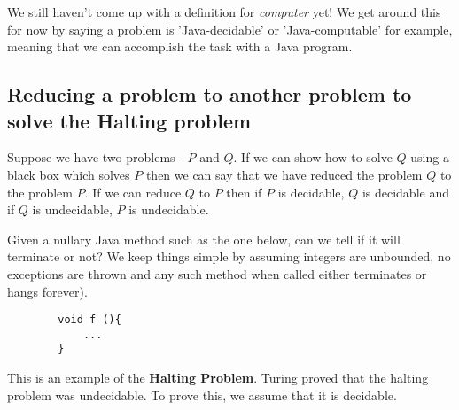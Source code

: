 \documentclass[11pt]{article}
\begin{document}
	We still haven't come up with a definition for \textit{computer} yet! We get around this for now by saying a problem is 'Java-decidable' or 'Java-computable' for example, meaning that we can accomplish the task with a Java program.

	\subsection{Reducing a problem to another problem to solve the Halting problem}
	Suppose we have two problems - $P$ and $Q$. If we can show how to solve $Q$ using a black box which solves $P$ then we can say that we have reduced the problem $Q$ to the problem $P$. If we can reduce $Q$ to $P$ then if $P$ is decidable, $Q$ is decidable and if $Q$ is undecidable, $P$ is undecidable.
	
	\par
	Given a nullary Java method such as the one below, can we tell if it will terminate or not? We keep things simple by assuming integers are unbounded, no exceptions are thrown and any such method when called either terminates or hangs forever).
	\begin{verbatim}
		void f (){
		    ...
		}
	\end{verbatim}
	
	This is an example of the \textbf{Halting Problem}. Turing proved that the halting problem was undecidable. To prove this, we assume that it is decidable.
	
\end{document}
